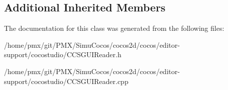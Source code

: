 \subsection*{Additional Inherited Members}


The documentation for this class was generated from the following files\+:\begin{DoxyCompactItemize}
\item 
/home/pmx/git/\+P\+M\+X/\+Simu\+Cocos/cocos2d/cocos/editor-\/support/cocostudio/C\+C\+S\+G\+U\+I\+Reader.\+h\item 
/home/pmx/git/\+P\+M\+X/\+Simu\+Cocos/cocos2d/cocos/editor-\/support/cocostudio/C\+C\+S\+G\+U\+I\+Reader.\+cpp\end{DoxyCompactItemize}
